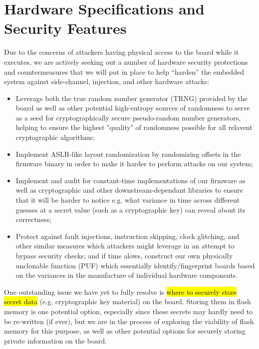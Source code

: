 \section{Hardware Specifications and Security Features}
\label{sec:hw-features}


Due to the concerns of attackers having physical access to the board while it executes, we are actively seeking out a number of hardware security protections and countermeasures that we will put in place to help ``harden'' the embedded system against side-channel, injection, and other hardware attacks:
\begin{itemize}
    \item Leverage both the true random number generator (TRNG) provided by the board as well as other potential high-entropy sources of randomness to serve as a seed for cryptographically secure pseudo-random number generators, helping to ensure the highest "quality" of randomness possible for all relavent cryptographic algorithms;
    \item Implement ASLR-like layout randomization by randomizing offsets in the firmware binary in order to make it harder to perform attacks on our system;
    \item Implement and audit for constant-time implementations of our firmware as well as cryptographic and other downstream-dependant libraries to ensure that it will be harder to notice e.g. what variance in time across different guesses at a secret value (such as a cryptographic key) can reveal about its correctness;
    \item Protect against fault injections, instruction skipping, clock glitching, and other similar measures which attackers might leverage in an attempt to bypass security checks; and
    if time alows, construct our own physically unclonable function (PUF) which essentially identify/fingerprint boards based on the variances in the manufacture of individual hardware components.
\end{itemize}

One outstanding issue we have yet to fully resolve is \hl{where to securely store secret data} (e.g. cryptographic key material) on the board. Storing them in flash memory is one potential option, especially since these secrets may hardly need to be re-written (if ever), but we are in the process of exploring the viability of flash memory for this purpose, as well as other potential options for securely storing private information on the board.

